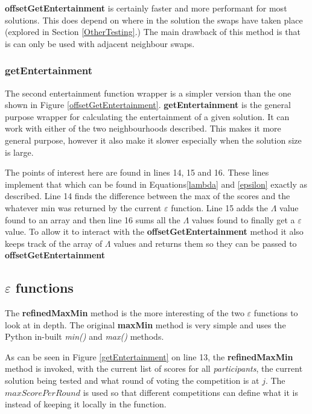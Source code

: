 \documentclass[12pt]{report}
\begin{document}
\textbf{offsetGetEntertainment} is certainly faster and more performant for most solutions. This does depend on where in the solution the swaps have taken place (explored in Section \ref{OtherTesting}.) The main drawback of this method is that is can only be used with adjacent neighbour swaps.

\subsubsection{getEntertainment}
The second entertainment function wrapper is a simpler version than the one shown in Figure \ref{offsetGetEntertainment}. \textbf{getEntertainment} is the general purpose wrapper for calculating the entertainment of a given solution. It can work with either of the two neighbourhoods described. This makes it more general purpose, however it also make it slower especially when the solution size is large.

The points of interest here are found in lines 14, 15 and 16. These lines implement that which can be found in Equations\ref{lambda} and \ref{epsilon} exactly as described. Line 14 finds the difference between the max of the scores and the whatever min was returned by the current $\varepsilon$ function. Line 15 adds the $\Lambda$ value found to an array and then line 16 sums all the $\Lambda$ values found to finally get a $\varepsilon$ value. To allow it to interact with the \textbf{offsetGetEntertainment} method it also keeps track of the array of $\Lambda$ values and returns them so they can be passed to \textbf{offsetGetEntertainment} 


\subsection{$\varepsilon$ functions}\label{Imp-eFunctions}
The \textbf{refinedMaxMin} method is the more interesting of the two $\varepsilon$ functions to look at in depth. The original \textbf{maxMin} method is very simple and uses the Python in-built \textit{min()} \cite{PythonMin} and \textit{max()} \cite{PythonMax} methods.

As can be seen in Figure \ref{getEntertainment} on line 13, the \textbf{refinedMaxMin} method is invoked, with the current list of scores for all \textit{participants}, the current solution being tested and what round of voting the competition is at $j$. The $maxScorePerRound$ is used so that different competitions can define what it is instead of keeping it locally in the function.
\end{document}
